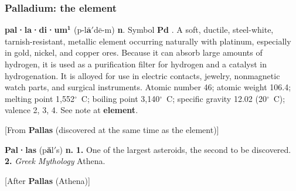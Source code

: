 \documentclass[10pt]{beamer}
\newcommand{\schwa}{\raisebox{1ex}{\begin{turn}{180}e\end{turn}}}
\begin{document}
\begin{frame}
  \frametitle{Palladium: the element}

\small

\textbf{pal·la·di·um$^{\mathbf{1}}$}
(p\schwa-l$\bar{\textbf{a}}'$d$\bar{\textrm{e}}$-\schwa m) \textbf{n}.\newline
Symbol \textbf{Pd} . A soft, ductile, steel-white, tarnish-resistant, metallic element
occurring naturally with platinum, especially in gold, nickel,
and copper ores. Because it can absorb large amounts of hydrogen,
it is used as a purification filter for hydrogen and a catalyst in
hydrogenation.  It is alloyed for use in electric contacts, jewelry,
nonmagnetic watch parts, and surgical instruments.  Atomic number 46;
atomic weight 106.4; melting point 1,552$^\circ$~C; boiling point
3,140$^\circ$~C; specific gravity 12.02 (20$^\circ$~C); valence 2,
3, 4.  See note at \textbf{element}.
\smallskip

[From \textbf{Pallas} (discovered at the same time as the element)]

\bigskip

\pause

\textbf{Pal·las} (p\textbf{\u{a}}l$'$\schwa s) \textbf{n.}\newline
\textbf{1.} One of the largest asteroids, the second to be discovered.\newline
\textbf{2.} \textit{Greek Mythology} Athena.
\smallskip

[After \textbf{Pallas} (Athena)]

\end{frame}
\end{document}
